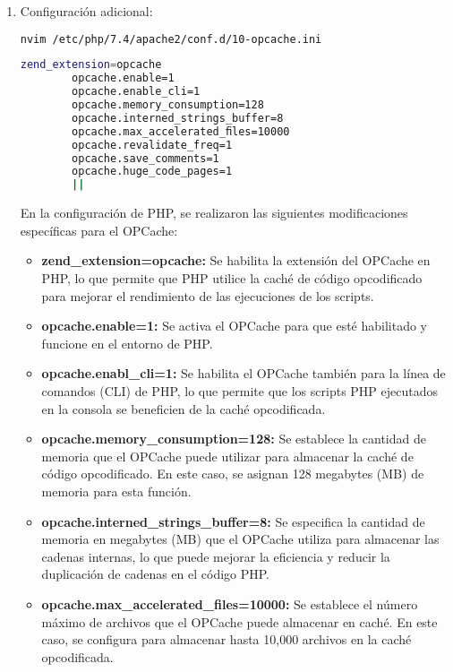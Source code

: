 \begin{enumerate}
	
			\item Conﬁguración adicional:
			\begin{lstlisting}[language=Bash,caption=Directorio de trabajo NextCloud]
			nvim /etc/php/7.4/apache2/conf.d/10-opcache.ini
			\end{lstlisting}
		
			\begin{lstlisting}[language=Bash,caption=Directorio de trabajo NextCloud]
		zend_extension=opcache
		opcache.enable=1
		opcache.enable_cli=1
		opcache.memory_consumption=128
		opcache.interned_strings_buffer=8
		opcache.max_accelerated_ﬁles=10000
		opcache.revalidate_freq=1
		opcache.save_comments=1
		opcache.huge_code_pages=1
		||\end{lstlisting}
		
		En la configuración de PHP, se realizaron las siguientes modificaciones específicas para el OPCache:
		
		\begin{itemize}
			

			
			\item \textbf{zend\_extension=opcache:} Se habilita la extensión del OPCache en PHP, lo que permite que PHP utilice la caché de código opcodificado para mejorar el rendimiento de las ejecuciones de los scripts.
			
			\item \textbf{opcache.enable=1:} Se activa el OPCache para que esté habilitado y funcione en el entorno de PHP.
			
			\item \textbf{opcache.enabl\_cli=1:} Se habilita el OPCache también para la línea de comandos (CLI) de PHP, lo que permite que los scripts PHP ejecutados en la consola se beneficien de la caché opcodificada.
			
			\item\textbf{opcache.memory\_consumption=128:} Se establece la cantidad de memoria que el OPCache puede utilizar para almacenar la caché de código opcodificado. En este caso, se asignan 128 megabytes (MB) de memoria para esta función.
			
			\item\textbf{opcache.interned\_strings\_buffer=8:} Se especifica la cantidad de memoria en megabytes (MB) que el OPCache utiliza para almacenar las cadenas internas, lo que puede mejorar la eficiencia y reducir la duplicación de cadenas en el código PHP.
			
			\item\textbf{opcache.max\_accelerated\_files=10000:} Se establece el número máximo de archivos que el OPCache puede almacenar en caché. En este caso, se configura para almacenar hasta 10,000 archivos en la caché opcodificada.
			

\end{itemize}
\end{enumerate}
